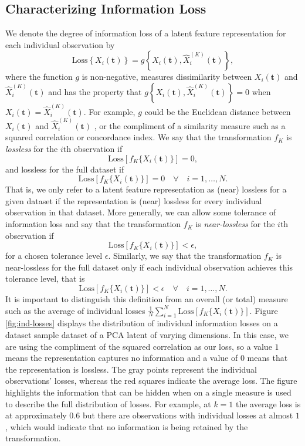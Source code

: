 \subsection{Characterizing Information Loss}\label{sec:characterising-information-loss}

We denote the degree of information loss of a latent feature representation for each individual observation by 
$$
\text{Loss} \left\{ X_i(\mathbf{t}) \right\} 
= g\left\{ X_i(\mathbf{t}), \widehat{X}_i^{(K)}(\mathbf{t}) \right\},
$$
where the function $g$ is non-negative, measures dissimilarity between $X_i(\mathbf{t})$ and $\widehat{X}_i^{(K)}(\mathbf{t})$ and has the property that $g\left\{ X_i(\mathbf{t}), \widehat{X}_i^{(K)}(\mathbf{t}) \right\}=0$ when $X_i(\mathbf{t})=\widehat{X}_i^{(K)}(\mathbf{t})$.
For example, $g$ could be the Euclidean distance between $X_i(\mathbf{t})$ and $\widehat{X}_i^{(K)}(\mathbf{t})$ \parencite{morris_comparison_2017}, or the compliment of a similarity measure such as a squared correlation or concordance index.
We say that the transformation $f_K$ is \emph{lossless} for the $i$th observation if
$$
\text{Loss} \left[ f_K\{X_i(\mathbf{t})\} \right] = 0,
$$
and lossless for the full dataset if
$$
\text{Loss} \left[ f_K\{X_i(\mathbf{t})\} \right] = 0 \quad \forall \quad  i = 1, \dots, N.
$$
That is, we only refer to a latent feature representation as (near) lossless for a given dataset if the representation is (near) lossless for every individual observation in that dataset.
More generally, we can allow some tolerance of information loss and say that
the transformation $f_K$ is \emph{near-lossless} for the $i$th observation if
$$
\text{Loss} \left[ f_K\{X_i(\mathbf{t})\} \right] < \epsilon,
$$
for a chosen tolerance level $\epsilon$. 
Similarly, we say that the transformation $f_K$ is near-lossless for the full dataset only if each individual observation achieves this tolerance level, that is
$$
\text{Loss} \left[ f_K\{X_i(\mathbf{t})\} \right] < \epsilon \quad \forall \quad  i = 1, \dots, N.
$$
It is important to distinguish this definition from an overall (or total) measure such as the average of individual losses $\frac{1}{N}\sum_{i=1}^N \text{Loss} \left[ f_K\{X_i(\mathbf{t})\} \right]$.
Figure \ref{fig:ind-losses} displays the distribution of individual information losses on a dataset sample dataset of a PCA latent of varying dimensions.
In this case, we are using the compliment of the squared correlation as our loss, so a value $1$ means the representation captures no information and a value of $0$ means that the representation is lossless.
The gray points represent the individual observations' losses, whereas the red squares indicate the average loss.
The figure highlights the information that can be hidden when on a single measure is used to describe the full distribution of losses. For example, at $k = 1$ the average loss is at approximately $0.6$ but there are observations with individual losses at almost $1$, which would indicate that no information is being retained by the transformation.


